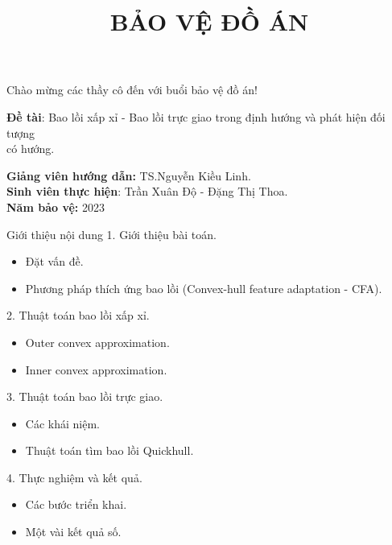 \documentclass[11pt]{beamer}
\title[ \footnotesize  \textcolor{red}{\bf Đồ án tốt nghiệp} -- \textcolor{blue}{Trần Xuân Độ - Đặng Thị Thoa}]{\Large  \bf BẢO VỆ ĐỒ ÁN}
\institute{\bf  Hà Nội, năm 2023\\}
\theoremstyle{definition}
\theoremstyle{plain}
\theoremstyle{plain}
\theoremstyle{remark}
\newcommand{\myitem}{\item[\tikz{\draw[ball color=myPurple,shade] (0,0) circle (0.17em);}]}
\newcommand\Fontvi{\fontsize{10}{7.2}\selectfont}
\begin{document}
\begin{frame}{\begin{center}
			Chào mừng các thầy cô đến với buổi bảo vệ đồ án!
	\end{center}}
	\begin{center}
	{\large	\textbf{Đề tài}: Bao lồi xấp xỉ - Bao lồi trực giao trong định hướng và phát hiện đối tượng \\
		có hướng.\\}
	\end{center}
	
	\textbf{Giảng viên hướng dẫn:} TS.Nguyễn Kiều Linh.\\
	
	\textbf{Sinh viên thực hiện}: Trần Xuân Độ - Đặng Thị Thoa.\\
	
	\textbf{Năm bảo vệ:} 2023
	
	
\end{frame}

\begin{frame}{Giới thiệu nội dung}
	1. Giới thiệu bài toán.
	\begin{itemize}
		\myitem Đặt vấn đề.
		\myitem Phương pháp thích ứng bao lồi (Convex-hull feature adaptation - CFA).
	 \end{itemize}
	2. Thuật toán bao lồi xấp xỉ.
	\begin{itemize}
		\myitem Outer convex approximation.
		\myitem Inner convex approximation. 
	\end{itemize}
	3. Thuật toán bao lồi trực giao. 
	\begin{itemize}
		\myitem Các khái niệm. 
		\myitem Thuật toán tìm bao lồi Quickhull.
	\end{itemize}
	4. Thực nghiệm và kết quả.
	\begin{itemize}
		\myitem Các bước triển khai.
		\myitem Một vài kết quả số.
	\end{itemize}
	
\end{frame}

	
	
\end{document}
